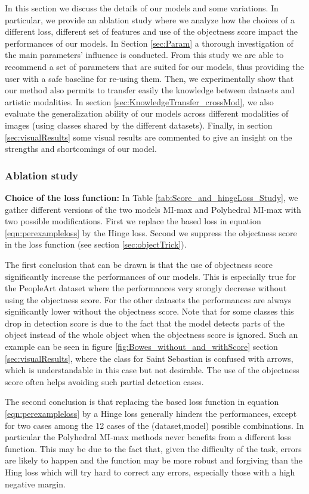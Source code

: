 \documentclass[preprint]{elsarticle}
\newcommand\MILS{MI-max}
\newcommand\MaxOfMaxS{Polyhedral MI-max}
\begin{document}
 In this section we discuss the details of our models and some variations. In particular, we provide an ablation study where we analyze how the choices of a different loss, different set of features and use of  the objectness  score impact the performances of our models. In Section \ref{sec:Param} a thorough investigation of the main parameters' influence is conducted. From this study we are able to recommend a set of parameters that are suited for our models, thus providing the user with a safe baseline for re-using them. Then, we experimentally show that our method also permits to transfer easily the knowledge between datasets and artistic modalities. In section \ref{sec:KnowledgeTransfer_crossMod}, we also evaluate the generalization ability of our models across different modalities of images (using classes shared by the different datasets).  Finally, in section \ref{sec:visualResults} some visual results are commented to give an insight on the strengths and shortcomings of our model. 

\subsubsection{Ablation study}
\label{sec:ablationStudy}
 {\bf Choice of the loss function:}
In Table \ref{tab:Score_and_hingeLoss_Study}, we gather different versions of the two models \MILS{} and \MaxOfMaxS{} with two possible modifications. First we replace the  based loss in equation \eqref{eqn:perexampleloss} by the Hinge loss. Second we suppress the objectness score in the loss function (see section \ref{sec:objectTrick}).

The first conclusion that can be drawn is that the use of objectness score significantly increase the performances of our models. This is especially true for the PeopleArt dataset where the performances very srongly decrease without using the objectness score. For the other datasets the performances are always significantly lower without the objectness score. Note that for some classes this drop in detection score is due to the fact that the model detects parts of the object instead of the whole object when the objectness score is ignored. Such an example can be seen in figure \ref{fig:Bowes_without_and_withScore} section \ref{sec:visualResults}, where the class for Saint Sebastian is confused with arrows, which is understandable in this case but not desirable. The use of the objectness score often helps avoiding such partial detection cases. 

The second conclusion is that replacing the  based loss function in equation \eqref{eqn:perexampleloss} by a Hinge loss  generally hinders the performances, except for two cases among the 12 cases of the (dataset,model) possible combinations. In particular the \MaxOfMaxS{} methods never benefits from a different loss function. This may be due to the fact that, given the difficulty of the task, errors are likely to happen and the  function may be more robust and forgiving than the Hing loss which will try hard to correct any errors, especially those with a high negative margin.  
 
\end{document}

